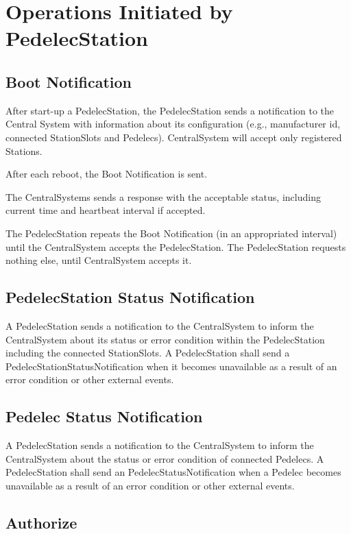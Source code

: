 \section{Operations Initiated by PedelecStation}

\subsection{Boot Notification}

After start-up a PedelecStation, the PedelecStation sends a notification to the Central System with information about its configuration (e.g., manufacturer id, connected StationSlots and Pedelecs). CentralSystem will accept only registered Stations. 

After each reboot, the Boot Notification is sent.

The CentralSystems sends a response with the acceptable status, including current time and heartbeat interval if accepted.

The PedelecStation repeats the Boot Notification (in an appropriated interval) until the CentralSystem accepts the PedelecStation. The PedelecStation requests nothing else, until CentralSystem accepts it.

\subsection{PedelecStation Status Notification}

A PedelecStation sends a notification to the CentralSystem to inform the CentralSystem about its status or error condition within the PedelecStation including the connected StationSlots. A PedelecStation shall send a PedelecStationStatusNotification when it becomes unavailable as a result of an error condition or other external events.

\subsection{Pedelec Status Notification}

A PedelecStation sends a notification to the CentralSystem to inform the CentralSystem about the status or error condition of connected Pedelecs. A PedelecStation shall send an PedelecStatusNotification when a Pedelec becomes unavailable as a result of an error condition or other external events.

\subsection{Authorize}


